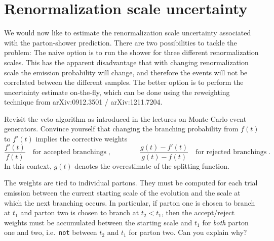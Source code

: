 \documentclass[10pt,fleqn]{scrartcl}
\begin{document}
\section{Renormalization scale uncertainty}
We would now like to estimate the renormalization scale uncertainty
associated with the parton-shower prediction. There are two possibilities
to tackle the problem: The naive option is to run the shower for three different
renormalization scales. This has the apparent disadvantage that with changing
renormalization scale the emission probability will change, and therefore the
events will not be correlated between the different samples. The better option
is to perform the uncertainty estimate on-the-fly, which can be done using the
reweighting technique from arXiv:0912.3501 / arXiv:1211.7204.

Revisit the veto algorithm as introduced in the lectures on Monte-Carlo
event generators. Convince yourself that changing the branching probability
from $f(t)$ to $f'(t)$ implies the corrective weights
\begin{equation*}
  \frac{f'(t)}{f(t)}\quad\text{for accepted branchings}\;,\qquad\qquad
  \frac{g(t)-f'(t)}{g(t)-f(t)}\quad\text{for rejected branchings}\;.
\end{equation*}
In this context, $g(t)$ denotes the overestimate of the splitting function.

The weights are tied to individual partons. They must be computed for each trial
emission between the current starting scale of the evolution and the scale
at which the next branching occurs. In particular, if parton one is chosen
to branch at $t_1$ and parton two is chosen to branch at $t_2<t_1$, then
the accept/reject weights must be accumulated between the starting scale
and $t_1$ for {\it both} parton one and two, i.e.\ {\tt not} between
$t_2$ and $t_1$ for parton two. Can you explain why?
\end{document}
